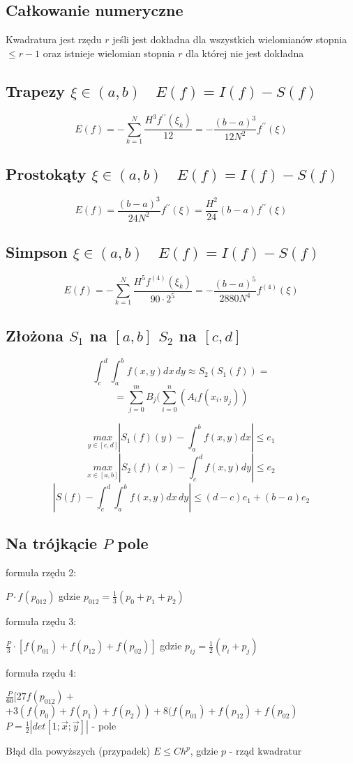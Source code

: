 \documentclass[twocolumn]{article}
\begin{document}
\begin{flushleft}
\thispagestyle{empty} %

\section{Całkowanie numeryczne}
Kwadratura jest rzędu $r$ jeśli jest dokładna dla wszystkich wielomianów stopnia $\leq r-1$ oraz istnieje wielomian stopnia $r$ dla której nie jest dokładna\\
\subsection{Trapezy $\xi \in \left(a,b\right) \quad E(f) = I(f) - S(f)$}
$$E(f) = -\sum_{k=1}^{N}\frac{H^3f^{\prime\prime}(\xi_k)}{12} =- \frac{(b-a)^3}{12N^2}f^{\prime\prime}(\xi)$$
\subsection{Prostokąty $\xi \in \left(a,b\right) \quad E(f) = I(f) - S(f)$}
$$E(f) = \frac{(b-a)^3}{24N^2}f^{\prime\prime}(\xi) = \frac{H^2}{24}(b-a) f^{\prime\prime}(\xi)$$
\subsection{Simpson $\xi \in \left(a,b\right) \quad E(f) = I(f) - S(f)$}
$$E(f)= -\sum_{k=1}^N \frac{H^5f^{(4)}(\xi_k)}{90\cdot2^5} =- \frac{(b-a)^5}{2880N^4}f^{(4)}(\xi) $$%
\subsection{Złożona $S_1$ na $[a,b]$ $S_2$ na $[c,d]$}
$$\int_c^d\int_a^b f(x,y) dx\, dy \approx S_2(S_1(f)) =$$
$$=\sum_{j=0}^m B_j (\sum_{i=0}^n(A_i f(x_i,y_j))$$

$$\underset{y\in[c,d]}{max} \left| S_1(f)(y) - \int_a^bf(x,y)dx \right| \leq e_1$$
$$\underset{x\in[a,b]}{max} \left| S_2(f)(x) - \int_c^df(x,y)dy \right| \leq e_2$$
$$\left| S(f) - \int_c^d\int_a^b f(x,y) dx \,dy \right| \leq (d-c) e_1 + (b-a) e_2$$
\subsection{Na trójkącie $P$ pole}
formuła rzędu 2:
\begin{center}
$P\cdot f(p_{012})$ gdzie $p_{012} = \frac{1}{3}(p_0+p_1+p_2)$
\end{center}
formuła rzędu 3:
\begin{center}
$\frac{P}{3}\cdot \left[f(p_{01})+f(p_{12})+f(p_{02})\right]$ gdzie $p_{ij} = \frac{1}{2}(p_i+p_j)$
\end{center}
formuła rzędu 4:
\begin{center}
$\frac{P}{60}[ 27f(p_{012})+$\\$ + 3(f(p_0)+f(p_1)+f(p_2)) + 8(f(p_{01})+f(p_{12})+f(p_{02})$\\
\vspace{2mm}
$P = \frac{1}{2}|det[1;\overrightarrow{x};\overrightarrow{y}]|$ - pole
\end{center}
Błąd dla powyższych (przypadek) $E \leq Ch^p$, gdzie $p$ - rząd kwadratur


\end{flushleft}
\end{document}
